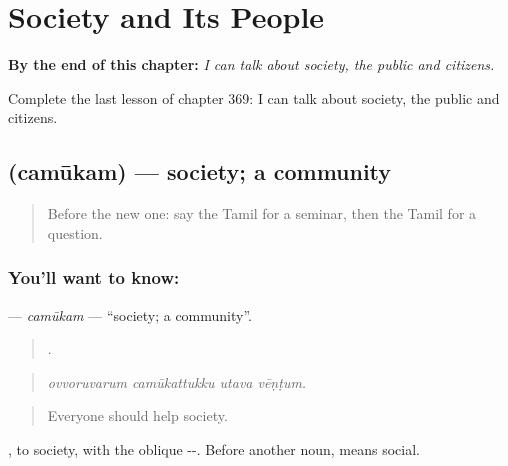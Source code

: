 
\chapter{Society and Its People}
\label{ch:ta-society-and-its-people}

\begin{chapteropening}
\textbf{By the end of this chapter:} \emph{I can talk about society, the public and citizens.}

Complete the last lesson of chapter 369: I can talk about society, the public and citizens.
\end{chapteropening}

\section[\texorpdfstring{\ta{சமூகம்} (camūkam)}{சமூகம் (camūkam)}]{ (camūkam) — society; a community}

\label{lesson:TA-C369-camukam}



\begin{quote}
Before the new one: say the Tamil for a seminar, then the Tamil for a question.
\end{quote}

\subsection*{You'll want to know: }
\textbf{} — \emph{camūkam} — \textquotedblleft{}society; a community\textquotedblright{}.

\begin{quote}
   .
\end{quote}

\begin{quote}
\emph{ovvoruvarum camūkattukku utava vēṇṭum.}
\end{quote}

\begin{quote}
Everyone should help society.
\end{quote}

, to society, with the oblique --. Before another noun,  means social.

